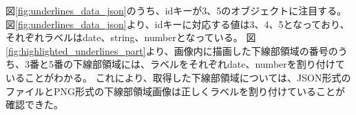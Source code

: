 図\ref{fig:underlines_data_json}のうち、idキーが3、5のオブジェクトに注目する。
図\ref{fig:underlines_data_json}より、idキーに対応する値は3、4、5となっており、それぞれラベルはdate、string、numberとなっている。
図\ref{fig:highlighted_underlines_part}より、画像内に描画した下線部領域の番号のうち、3番と5番の下線部領域には、ラベルをそれぞれdate、numberを割り付けていることがわかる。
これにより、取得した下線部領域については、JSON形式のファイルとPNG形式の下線部領域画像は正しくラベルを割り付けていることが確認できた。